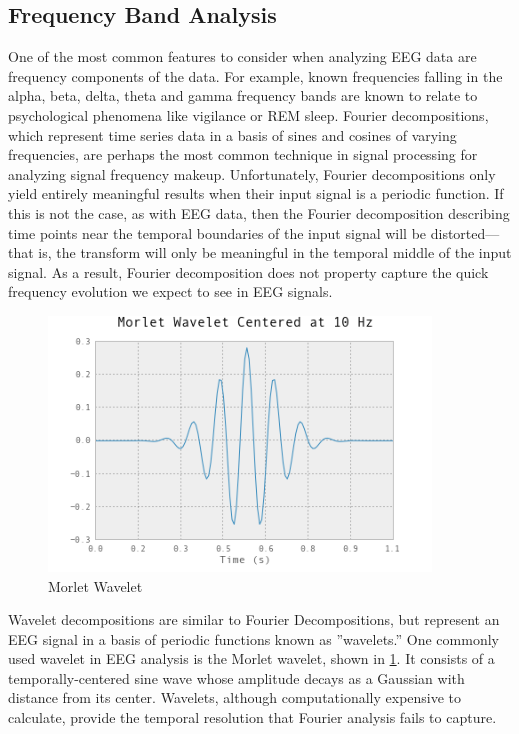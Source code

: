 \documentclass[12pt]{report}
\begin{document}
	
\subsection{Frequency Band Analysis}
	One of the most common features to consider when analyzing EEG data are frequency components of the data.  For example, known frequencies falling in the alpha, beta, delta, theta and gamma frequency bands are known to relate to psychological phenomena like vigilance or REM sleep.   Fourier decompositions, which represent time series data in a basis of sines and cosines of varying frequencies, are perhaps the most common technique in signal processing for analyzing signal frequency makeup.  Unfortunately, Fourier decompositions only yield entirely meaningful results when their input signal is a periodic function.   If this is not the case, as with EEG data, then the Fourier decomposition describing time points near the temporal boundaries of the input signal will be distorted—that is, the transform will only be meaningful in the temporal middle of the input signal.  As a result, Fourier decomposition does not property capture the quick frequency evolution we expect to see in EEG signals.  

\begin{figure}[t]
\centering
\includegraphics[width=4in]{morletwavelet}
\caption{Morlet Wavelet \label{morlet}}
\end{figure}


	Wavelet decompositions are similar to Fourier Decompositions, but represent an EEG signal in a basis of periodic functions known as ''wavelets.''  One commonly used wavelet in EEG analysis is the Morlet wavelet, shown in \ref{morlet}.  It consists of a temporally-centered sine wave whose amplitude decays as a Gaussian with distance from its center.  Wavelets, although computationally expensive to calculate, provide the temporal resolution that Fourier analysis fails to capture.  
\end{document}
